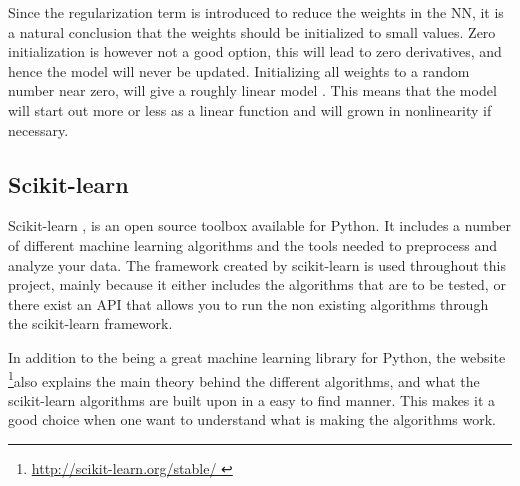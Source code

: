             Since the regularization term is introduced to reduce the weights in the NN, it is a natural conclusion that the weights should be initialized to small values. Zero initialization is however not a good option, this will lead to zero derivatives, and hence the model will never be updated. Initializing all weights to a random number near zero, will give a roughly linear model \cite{Hastie}. This means that the model will start out more or less as a linear function and will grown in nonlinearity if necessary. 

    \subsection{Scikit-learn}
    Scikit-learn \cite{scikit-learn}, \cite{scikit-web} is an open source toolbox available for Python. It includes a number of different machine learning algorithms and the tools needed to preprocess and analyze your data. The framework created by scikit-learn is used throughout this project, mainly because it either includes the algorithms that are to be tested, or there exist an API that allows you to run the non existing algorithms through the scikit-learn framework. 
    
    In addition to the being a great machine learning library for Python, the website \footnote{\url{http://scikit-learn.org/stable/ }}also explains the main theory behind the different algorithms, and what the scikit-learn algorithms are built upon in a easy to find manner. This makes it a good choice when one want to understand what is making the algorithms work.        
    
